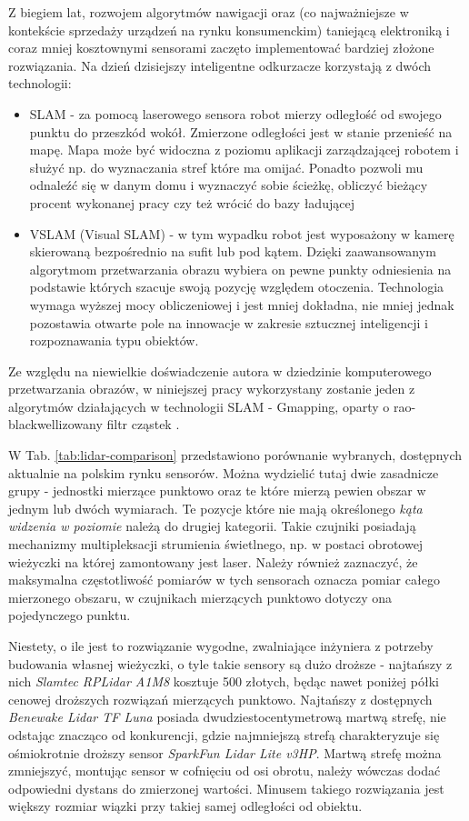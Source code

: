 Z biegiem lat, rozwojem algorytmów nawigacji oraz (co najważniejsze w kontekście sprzedaży urządzeń na rynku konsumenckim) taniejącą elektroniką i coraz mniej kosztownymi sensorami zaczęto implementować bardziej złożone rozwiązania. Na dzień dzisiejszy inteligentne odkurzacze korzystają z dwóch technologii:
\begin{itemize}
\item SLAM - za pomocą laserowego sensora robot mierzy odległość od swojego punktu do przeszkód wokół. Zmierzone odległości jest w stanie przenieść na mapę. Mapa może być widoczna z poziomu aplikacji zarządzającej robotem i służyć np. do wyznaczania stref które ma omijać. Ponadto pozwoli mu odnaleźć się w danym domu i wyznaczyć sobie ścieżkę, obliczyć bieżący procent wykonanej pracy czy też wrócić do bazy ładującej
\item VSLAM (Visual SLAM) - w tym wypadku robot jest wyposażony w kamerę skierowaną bezpośrednio na sufit lub pod kątem. Dzięki zaawansowanym algorytmom przetwarzania obrazu wybiera on pewne punkty odniesienia na podstawie których szacuje swoją pozycję względem otoczenia. Technologia wymaga wyższej mocy obliczeniowej i jest mniej dokładna, nie mniej jednak pozostawia otwarte pole na innowacje w zakresie sztucznej inteligencji i rozpoznawania typu obiektów.
\end{itemize}

Ze względu na niewielkie doświadczenie autora w dziedzinie komputerowego przetwarzania obrazów, w niniejszej pracy wykorzystany zostanie jeden z algorytmów działających w technologii SLAM - Gmapping, oparty o rao-blackwellizowany filtr cząstek \cite{Murphy2000}\cite{Grisetti2005}\cite{Grisetti2007}.

W Tab. \ref{tab:lidar-comparison} przedstawiono porównanie wybranych, dostępnych aktualnie na polskim rynku sensorów. Można wydzielić tutaj dwie zasadnicze grupy - jednostki mierzące punktowo oraz te które mierzą pewien obszar w jednym lub dwóch wymiarach. Te pozycje które nie mają określonego \emph{kąta widzenia w poziomie} należą do drugiej kategorii. Takie czujniki posiadają mechanizmy multipleksacji strumienia świetlnego, np. w postaci obrotowej wieżyczki na której zamontowany jest laser. Należy również zaznaczyć, że maksymalna częstotliwość pomiarów w tych sensorach oznacza pomiar całego mierzonego obszaru, w czujnikach mierzących punktowo dotyczy ona pojedynczego punktu.

Niestety, o ile jest to rozwiązanie wygodne, zwalniające inżyniera z potrzeby budowania własnej wieżyczki, o tyle takie sensory są dużo droższe - najtańszy z nich \emph{Slamtec RPLidar A1M8} kosztuje 500 złotych, będąc nawet poniżej półki cenowej droższych rozwiązań mierzących punktowo. Najtańszy z dostępnych \emph{Benewake Lidar TF Luna} posiada dwudziestocentymetrową martwą strefę, nie odstając znacząco od konkurencji, gdzie najmniejszą strefą charakteryzuje się ośmiokrotnie droższy sensor \emph{SparkFun Lidar Lite v3HP}. Martwą strefę można zmniejszyć, montując sensor w cofnięciu od osi obrotu, należy wówczas dodać odpowiedni dystans do zmierzonej wartości. Minusem takiego rozwiązania jest większy rozmiar wiązki przy takiej samej odległości od obiektu. 

